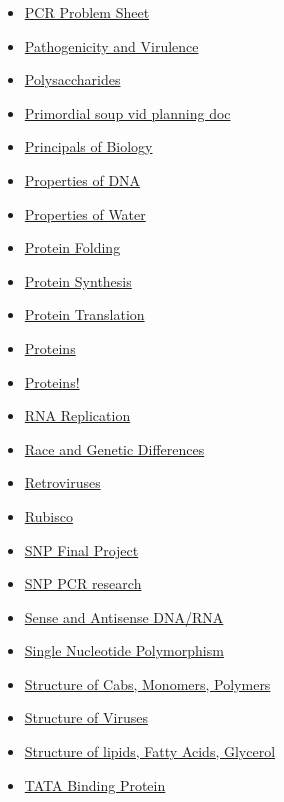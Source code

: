 \documentclass[11pt]{article}
\begin{document}
\begin{itemize}
\begin{itemize}
\item \href{bio101/KBxPCRcont.org}{PCR Problem Sheet}
\item \href{bio101/KBhBIO101PathogenicityandVirulence.org}{Pathogenicity and Virulence}
\item \href{bio101/KBe2020bio101floPolysaccharides.org}{Polysaccharides}
\item \href{bio101/KBBioPrimoridalSoupPlanning.org}{Primordial soup vid planning doc}
\item \href{bio101/KBhBIO101PrinciplesofBio.org}{Principals of Biology}
\item \href{bio101/KBrefPropertiesOfDNA.org}{Properties of DNA}
\item \href{bio101/KBhBIO101PropsOfWater.org}{Properties of Water}
\item \href{bio101/KBe2020bio101refProteinFolding.org}{Protein Folding}
\item \href{bio101/KBhBIO101ProteinSynthesis.org}{Protein Synthesis}
\item \href{bio101/KBhBIO101Translation.org}{Protein Translation}
\item \href{bio101/KBhBIO101Proteins.org}{Proteins}
\item \href{bio101/KBe20bio101refProteinsIndex.org}{Proteins!}
\item \href{bio101/KBhBIO101RNAReplication.org}{RNA Replication}
\item \href{bio101/KBhBIO101RaceAndGenetics.org}{Race and Genetic Differences}
\item \href{bio101/KBhBIO101Retroviruses.org}{Retroviruses}
\item \href{bio101/KBrefRubisco.org}{Rubisco}
\item \href{bio101/KBxSNPFinal.org}{SNP Final Project}
\item \href{bio101/KBxSNPPCR.org}{SNP PCR research}
\item \href{bio101/KBhBIO101SenseAndAntisense.org}{Sense and Antisense DNA/RNA}
\item \href{bio101/KBhBIO101SNP.org}{Single Nucleotide Polymorphism}
\item \href{bio101/KBhBIO101StructuresofCarbs.org}{Structure of Cabs, Monomers, Polymers}
\item \href{bio101/KBhBIO101StructureOfViruses.org}{Structure of Viruses}
\item \href{bio101/KBhBIO101StructuresOfLipids.org}{Structure of lipids, Fatty Acids, Glycerol}
\item \href{bio101/KBhBIO101TATABinding.org}{TATA Binding Protein}

\end{itemize}
\end{itemize}
\end{document}
